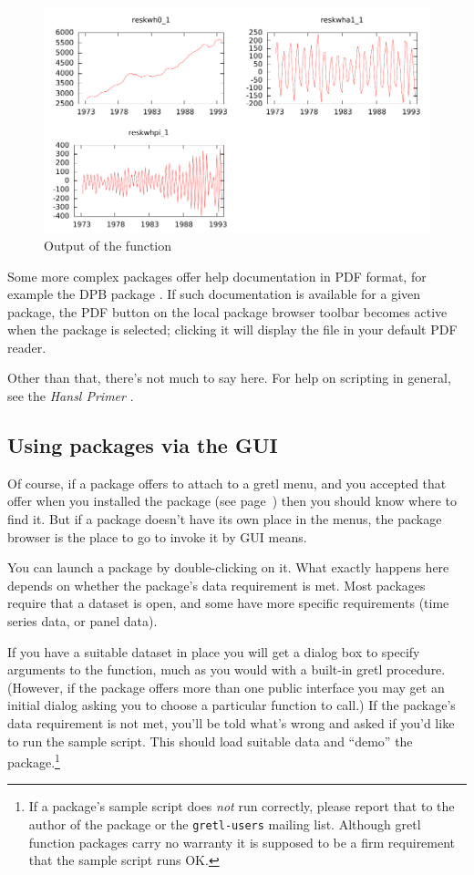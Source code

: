 \documentclass[oneside]{book}
\begin{document}
\begin{figure}[htbp]
  \centering
  \includegraphics[scale=0.9]{figures/ghegy-plot}
  \caption{Output of the  function}
  \label{fig:ghegy-plot}
\end{figure}

Some more complex packages offer help documentation in PDF format, for
example the \textsf{DPB} package \citep[see][]{DPBwp}.  If such
documentation is available for a given package, the PDF button on the
local package browser toolbar becomes active when the package is
selected; clicking it will display the file in your default PDF
reader.

Other than that, there's not much to say here. For help on scripting
in general, see the \textit{Hansl Primer} \citep{hansl-primer}.

\subsection{Using packages via the GUI}
\label{sec:gui-using}

Of course, if a package offers to attach to a gretl menu, and you
accepted that offer when you installed the package (see
page~\pageref{pg:menu-hook}) then you should know where to find it.
But if a package doesn't have its own place in the menus, the
package browser is the place to go to invoke it by GUI means.

You can launch a package by double-clicking on it. What exactly
happens here depends on whether the package's data requirement is
met. Most packages require that a dataset is open, and some have more
specific requirements (time series data, or panel data).

If you have a suitable dataset in place you will get a dialog box to
specify arguments to the function, much as you would with a built-in
gretl procedure. (However, if the package offers more than one public
interface you may get an initial dialog asking you to choose a
particular function to call.) If the package's data requirement is not
met, you'll be told what's wrong and asked if you'd like to run the
sample script. This should load suitable data and ``demo'' the
package.\footnote{If a package's sample script does \textit{not} run
  correctly, please report that to the author of the package or the
  \texttt{gretl-users} mailing list. Although gretl function packages
  carry no warranty it is supposed to be a firm requirement that the
  sample script runs OK.}
\end{document}
